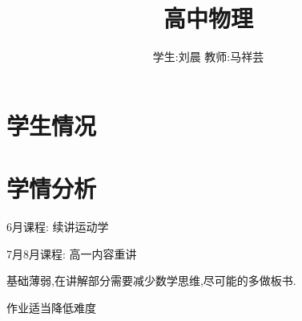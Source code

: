 \documentclass{article}
\title{高中物理}
\author{学生:\quad 刘晨 \quad 教师:\quad 马祥芸}
\begin{document}
    \maketitle
    \tableofcontents
    \newpage

    \section{学生情况}
    \begin{center}
    \end{center}
        
    \section{学情分析}
    6月课程:
    续讲运动学

    7月8月课程:
    高一内容重讲

    基础薄弱,在讲解部分需要减少数学思维,尽可能的多做板书.

    作业适当降低难度
\end{document}
